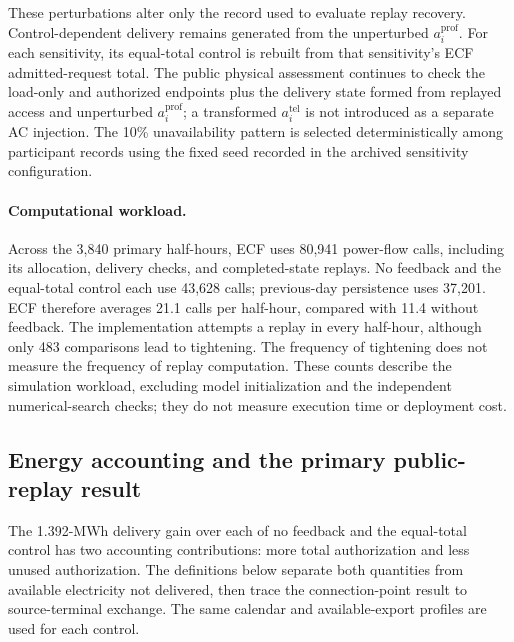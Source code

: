 \documentclass[11pt]{article}
\begin{document}
These perturbations alter only the record used to evaluate replay recovery.
Control-dependent delivery remains generated from the unperturbed
$a_i^{\mathrm{prof}}$. For each sensitivity, its equal-total control is rebuilt
from that sensitivity's ECF admitted-request total. The public physical assessment
continues to check the load-only and authorized endpoints plus the delivery state
formed from replayed access and unperturbed $a_i^{\mathrm{prof}}$; a transformed
$a_i^{\mathrm{tel}}$ is not introduced as a separate AC injection. The 10\%
unavailability pattern is selected deterministically among participant records
using the fixed seed recorded in the archived sensitivity configuration.

\paragraph{Computational workload.}
Across the 3,840 primary half-hours, ECF uses 80,941 power-flow calls, including
its allocation, delivery checks, and completed-state replays. No feedback and
the equal-total control each use 43,628 calls; previous-day persistence uses
37,201. ECF therefore averages 21.1 calls per half-hour, compared with 11.4
without feedback. The implementation attempts a replay in every half-hour,
although only 483 comparisons lead to tightening. The frequency of tightening
does not measure the frequency of replay computation. These counts describe
the simulation workload, excluding model initialization and the independent
numerical-search checks; they do not measure execution time or deployment cost.

\subsection{Energy accounting and the primary public-replay result}
\label{supp:au_energy}

The 1.392-MWh delivery gain over each of no feedback and the equal-total
control has two accounting contributions: more total authorization and less
unused authorization. The definitions below
separate both quantities from available electricity not delivered, then trace
the connection-point result to source-terminal exchange. The same calendar and
available-export profiles are used for each control.
\end{document}
